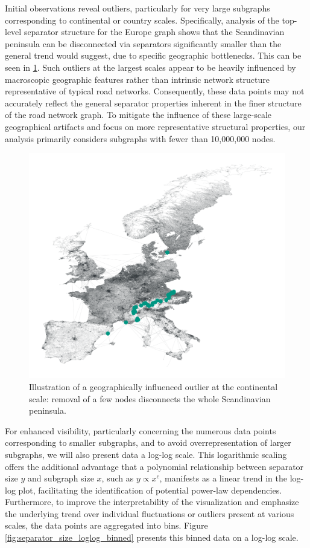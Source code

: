 Initial observations reveal outliers, particularly for very large subgraphs corresponding to continental or country scales.
Specifically, analysis of the top-level separator structure for the Europe graph shows that the Scandinavian peninsula can be disconnected via separators significantly smaller than the general trend would suggest, due to specific geographic bottlenecks.
This can be seen in \cref{fig:europe_top_separator}.
Such outliers at the largest scales appear to be heavily influenced by macroscopic geographic features rather than intrinsic network structure representative of typical road networks.
Consequently, these data points may not accurately reflect the general separator properties inherent in the finer structure of the road network graph.
To mitigate the influence of these large-scale geographical artifacts and focus on more representative structural properties, our analysis primarily considers subgraphs with fewer than 10,000,000 nodes.

\begin{figure}
	\centering
	\includegraphics[width=0.6\linewidth]{graphics/europe-top-level-sep.png}
	\caption{Illustration of a geographically influenced outlier at the continental scale: removal of a few nodes disconnects the whole Scandinavian peninsula.}
	\label{fig:europe_top_separator}
\end{figure}

For enhanced visibility, particularly concerning the numerous data points corresponding to smaller subgraphs, and to avoid overrepresentation of larger subgraphs, we will also present data a log-log scale.
This logarithmic scaling offers the additional advantage that a polynomial relationship between separator size \( y \) and subgraph size \( x \), such as \( y \propto x^c \), manifests as a linear trend in the log-log plot, facilitating the identification of potential power-law dependencies.
Furthermore, to improve the interpretability of the visualization and emphasize the underlying trend over individual fluctuations or outliers present at various scales, the data points are aggregated into bins.
Figure \cref{fig:separator_size_loglog_binned} presents this binned data on a log-log scale.

